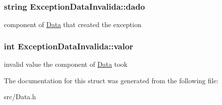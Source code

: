 \subsubsection[{dado}]{\setlength{\rightskip}{0pt plus 5cm}string Exception\+Data\+Invalida\+::dado}\label{struct_exception_data_invalida_a4856178b04ae4fda6cb2f3ce87040bf3}
component of \hyperlink{class_data}{Data} that created the exception \hypertarget{struct_exception_data_invalida_ac9865bf078e2d0b7d36aa81fced67967}{}
\subsubsection[{valor}]{\setlength{\rightskip}{0pt plus 5cm}int Exception\+Data\+Invalida\+::valor}\label{struct_exception_data_invalida_ac9865bf078e2d0b7d36aa81fced67967}
invalid value the component of \hyperlink{class_data}{Data} took 

The documentation for this struct was generated from the following file\+:\begin{DoxyCompactItemize}
\item 
src/Data.\+h\end{DoxyCompactItemize}
